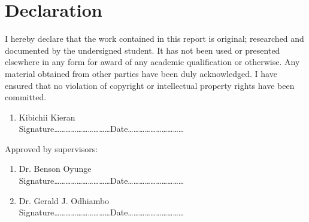 \section*{Declaration}

I hereby declare that the work contained in this report is original; researched and documented by the undersigned student. It has not been used or presented elsewhere in any form for award of any academic qualification or otherwise. Any material obtained from other parties have been duly acknowledged. I have ensured that no violation of copyright or intellectual property rights have been committed.
\begin{enumerate}

	\item Kibichii Kieran\vspace*{.2cm}\\
	Signature\ldots\ldots\ldots\ldots\ldots\ldots\ldots\ldots\ldots\ldots Date\ldots\ldots\ldots\ldots\ldots\ldots\ldots\ldots\ldots\ldots
\end{enumerate}

\vspace*{.5cm}
Approved by supervisors:
\begin{enumerate}
	\item Dr. Benson Oyunge \vspace*{.2cm}\\
	Signature\ldots\ldots\ldots\ldots\ldots\ldots\ldots\ldots\ldots\ldots Date\ldots\ldots\ldots\ldots\ldots\ldots\ldots\ldots\ldots\ldots

	\item Dr. Gerald J. Odhiambo\vspace*{.2cm}\\
	Signature\ldots\ldots\ldots\ldots\ldots\ldots\ldots\ldots\ldots\ldots Date\ldots\ldots\ldots\ldots\ldots\ldots\ldots\ldots\ldots\ldots
\end{enumerate}


